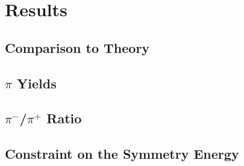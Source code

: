 \chapter{Results}
\section{Comparison to Theory}
\section{$\pi$ Yields}
\section{$\pi^-$/$\pi^+$ Ratio}
\section{Constraint on the Symmetry Energy}